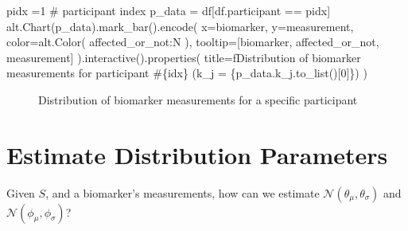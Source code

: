 \documentclass[
  letterpaper,
  DIV=11,
  numbers=noendperiod]{scrreprt}
\newenvironment{Shaded}{\begin{snugshade}}{\end{snugshade}}
\newcommand{\CommentTok}[1]{\textcolor[rgb]{0.37,0.37,0.37}{#1}}
\newcommand{\DecValTok}[1]{\textcolor[rgb]{0.68,0.00,0.00}{#1}}
\newcommand{\NormalTok}[1]{\textcolor[rgb]{0.00,0.23,0.31}{#1}}
\newcommand{\OperatorTok}[1]{\textcolor[rgb]{0.37,0.37,0.37}{#1}}
\newcommand{\SpecialCharTok}[1]{\textcolor[rgb]{0.37,0.37,0.37}{#1}}
\newcommand{\SpecialStringTok}[1]{\textcolor[rgb]{0.13,0.47,0.30}{#1}}
\newcommand{\StringTok}[1]{\textcolor[rgb]{0.13,0.47,0.30}{#1}}
\begin{document}
\begin{Shaded}
\begin{Highlighting}[]
\NormalTok{pidx }\OperatorTok{=}\DecValTok{1} \CommentTok{\# participant index}
\NormalTok{p\_data }\OperatorTok{=}\NormalTok{ df[df.participant }\OperatorTok{==}\NormalTok{ pidx]}
\NormalTok{alt.Chart(p\_data).mark\_bar().encode(}
\NormalTok{    x}\OperatorTok{=}\StringTok{\textquotesingle{}biomarker\textquotesingle{}}\NormalTok{,}
\NormalTok{    y}\OperatorTok{=}\StringTok{\textquotesingle{}measurement\textquotesingle{}}\NormalTok{,}
\NormalTok{    color}\OperatorTok{=}\NormalTok{alt.Color(}
        \StringTok{\textquotesingle{}affected\_or\_not:N\textquotesingle{}}
\NormalTok{    ),}
\NormalTok{    tooltip}\OperatorTok{=}\NormalTok{[}\StringTok{\textquotesingle{}biomarker\textquotesingle{}}\NormalTok{, }\StringTok{\textquotesingle{}affected\_or\_not\textquotesingle{}}\NormalTok{, }\StringTok{\textquotesingle{}measurement\textquotesingle{}}\NormalTok{]}
\NormalTok{).interactive().properties(}
\NormalTok{    title}\OperatorTok{=}\SpecialStringTok{f\textquotesingle{}Distribution of biomarker measurements for participant \#}\SpecialCharTok{\{}\NormalTok{idx}\SpecialCharTok{\}}\SpecialStringTok{ (k\_j = }\SpecialCharTok{\{}\NormalTok{p\_data}\SpecialCharTok{.}\NormalTok{k\_j}\SpecialCharTok{.}\NormalTok{to\_list()[}\DecValTok{0}\NormalTok{]}\SpecialCharTok{\}}\SpecialStringTok{)\textquotesingle{}}
\NormalTok{)}
\end{Highlighting}
\end{Shaded}

\begin{figure}[H]


\caption{\label{fig-dist-biomarker-vals-for-participant}Distribution of
biomarker measurements for a specific participant}

\end{figure}%


\chapter{Estimate Distribution
Parameters}\label{sec-estimate-dist-params}

Given \(S\), and a biomarker's measurements, how can we estimate
\(\mathcal N(\theta_{\mu}, \theta_{\sigma})\) and
\(\mathcal N(\phi_{\mu}, \phi_{\sigma})\)?
\end{document}
